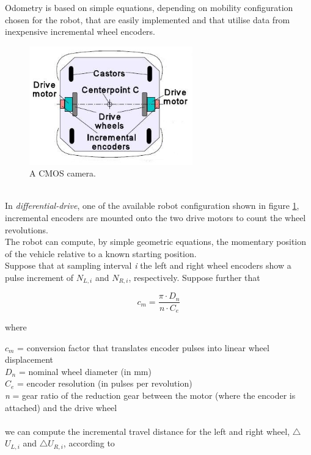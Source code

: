 Odometry is based on simple equations, depending on mobility configuration
chosen for the robot, that are easily implemented and that utilise
data from inexpensive incremental wheel encoders.
\begin{figure} [!h]
  \begin{center}
    \includegraphics[width=200pt]{img/differential_drive.jpg}
    \caption{A CMOS camera.}
    \label{fig:differential_drive}
  \end{center}
\end{figure}
\\
In \textit{differential-drive}, one of the available robot configuration
shown in figure \ref{fig:differential_drive}, incremental encoders
are mounted onto the two
drive motors to count the wheel revolutions.
\\
The robot can compute, by simple geometric equations, the momentary
position of the vehicle relative to a known starting position.
\\
Suppose that at sampling interval \textit{i} the left and right wheel
encoders show a pulse increment of \textit{$N_{L,i}$} and \textit{$N_{R,i}$},
respectively. Suppose further that

\[
c_m = \frac{\pi \cdot D_n } {n \cdot C_e }
\]

where

\textit{$c_m$} = conversion factor that translates encoder pulses into
linear wheel displacement \\
\textit{$D_n$} = nominal wheel diameter (in mm) \\
\textit{$C_e$} = encoder resolution (in pulses per revolution) \\
\textit{n}   = gear ratio of the reduction gear between the motor
(where the encoder is attached) and the drive wheel \\
\\
we can compute the incremental travel distance for the left and
right wheel, $\bigtriangleup$$U_{L,i}$ and $\bigtriangleup$$U_{R,i}$,
according to

